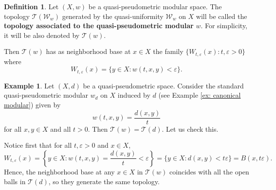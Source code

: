 \documentclass[11pt,a4paper]{amsart}
\theoremstyle{definition}
\newtheorem{definition}[theorem]{Definition}
\newtheorem{example}[theorem]{Example}
\begin{document}
	\begin{definition}
		Let $(X,w)$ be a quasi-pseudometric modular space. The topology $\mathcal{T}(\mathcal{W}_w)$ generated by the quasi-uniformity $\mathcal{W}_w$ on $X$  will be called the \textbf{topology associated to the quasi-pseudometric modular} $w$. For simplicity, it will be also denoted by $\mathcal{T}(w)$.
		
		Then $\mathcal{T}(w)$ has as neighborhood base at $x\in X$ the family $\{W_{t,\varepsilon}(x):t,\varepsilon>0\}$ where
		$$W_{t,\varepsilon}(x)=\{y\in X:w(t,x,y)<\varepsilon\}.$$
		
	\end{definition}
	
	
	\begin{example}\label{ex:topology_sqpmm}
		Let $(X,d)$ be a quasi-pseudometric space. Consider the standard quasi-pseudometric modular $w_d$ on $X$ induced by $d$ (see Example \ref{ex: canonical modular}) given by  $$w(t,x,y)=\frac{d(x,y)}{t}$$ for all $x,y\in X$ and all $t>0.$ Then $\mathcal{T}(w)=\mathcal{T}(d)$. Let us check this.
		
		Notice first that for all $t,\varepsilon>0$ and $x\in X$,
		\[W_{t,\varepsilon}(x)=\left\{y\in X: w(t,x,y)=\frac{d(x,y)}{t}<\varepsilon\right\}=\{y\in X: d(x,y)<t\varepsilon\}=B(x,t\varepsilon).\]
		Hence, the neighborhood base at any $x\in X$ in $\mathcal{T}(w)$ coincides with all the open balls in $\mathcal{T}(d)$, so they generate the same topology.
	\end{example}
	
\end{document}
